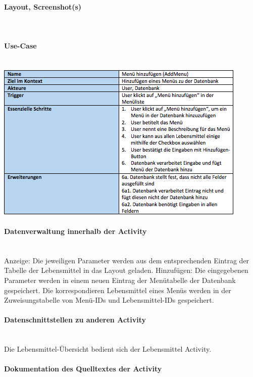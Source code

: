 \paragraph{Layout, Screenshot(s)}\\
\paragraph{Use-Case}$~~$\\
\newline
\includegraphics[scale=1]{img/usecaseaddmenu}\\
\paragraph{Datenverwaltung innerhalb der Activity}\\
Anzeige: Die jeweiligen Parameter werden aus dem entsprechenden Eintrag der Tabelle der Lebensmittel in das Layout geladen. 
Hinzufügen: Die eingegebenen Parameter werden in einem neuen Eintrag der Menütabelle der Datenbank gespeichert. Die korrespondieren Lebensmittel eines Menüs werden in der Zuweisungstabelle von Menü-IDs und Lebensmittel-IDs gespeichert. 

\paragraph{Datenschnittstellen zu anderen Activity}\\
Die Lebensmittel-Übersicht bedient sich der Lebensmittel Activity. 

\paragraph{Dokumentation des Quelltextes der Activity}\\

